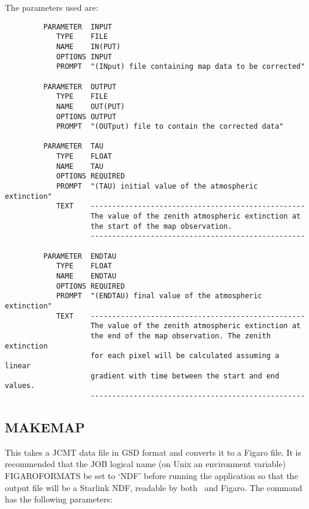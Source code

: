 \documentclass[twoside,11pt]{article}
\newcommand{\xref}[3]{#1}
\newcommand{\xlabel}[1]{}
\renewcommand{\_}{\texttt{\symbol{95}}}
\newcommand{\Kappa}{\xref{{\sc{Kappa}}}{sun95}{}}
\begin{document}
\goodbreak

The parameters used are:

\begin{small}
\begin{verbatim}
         PARAMETER  INPUT
            TYPE    FILE
            NAME    IN(PUT)
            OPTIONS INPUT
            PROMPT  "(INput) file containing map data to be corrected"

         PARAMETER  OUTPUT
            TYPE    FILE
            NAME    OUT(PUT)
            OPTIONS OUTPUT
            PROMPT  "(OUTput) file to contain the corrected data"

         PARAMETER  TAU
            TYPE    FLOAT
            NAME    TAU
            OPTIONS REQUIRED
            PROMPT  "(TAU) initial value of the atmospheric extinction"
            TEXT    --------------------------------------------------
                    The value of the zenith atmospheric extinction at
                    the start of the map observation.
                    --------------------------------------------------

         PARAMETER  ENDTAU
            TYPE    FLOAT
            NAME    ENDTAU
            OPTIONS REQUIRED
            PROMPT  "(ENDTAU) final value of the atmospheric extinction"
            TEXT    --------------------------------------------------
                    The value of the zenith atmospheric extinction at
                    the end of the map observation. The zenith extinction
                    for each pixel will be calculated assuming a linear
                    gradient with time between the start and end values.
                    --------------------------------------------------
\end{verbatim}
\end{small}


\goodbreak

\subsection{\xlabel{MAKEMAP}MAKEMAP}

This takes a JCMT data file in GSD format and converts it to a Figaro
file. It is recommended that the JOB logical name (on Unix an
environment variable) FIGARO\_FORMATS be
set  to `NDF' before running the application so that the output file
will be a Starlink NDF, readable by both \Kappa\ and Figaro. The command
has the following parameters:

\goodbreak
\end{document}
